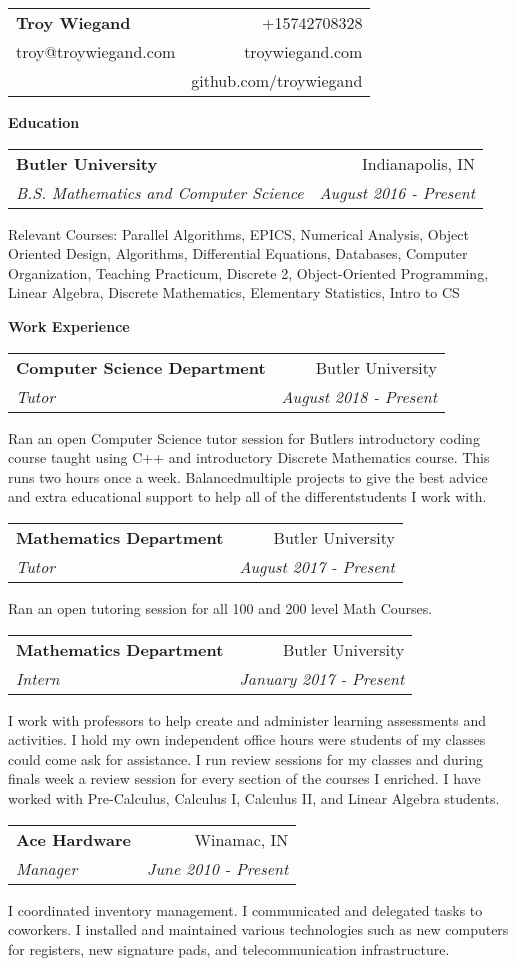 \documentclass[letterpaper,11pt]{article}
\makeatletter
\newcommand{\resheading}[1]{ \begin{trixiematel}\textbf{#1}\end{trixiematel}}
\newcommand{\ressubheading}[4]{
\begin{tabular*}{6.5in}{l@{\extracolsep{\fill}}r}
                \textbf{#1} & #2 \\
                \textit{#3} & \textit{#4} \\
\end{tabular*}\vspace{2pt}}
\newcommand{\Heading}[5]{
    \begin{tabular*}{7in}{l@{\extracolsep{\fill}}r}
        \textbf{\Large #1}  & #2\\
        #3 & #4 \\
        & #5 \\
        \end{tabular*}}
\makeatother
\begin{document}
\Heading{Troy Wiegand}{+15742708328}{troy@troywiegand.com}{troywiegand.com}{github.com/troywiegand}
\vspace{0.1in}

\resheading{Education}
\begin{description}
\item
\ressubheading{Butler University}{Indianapolis, IN}{B.S. Mathematics and Computer Science}{August 2016 - Present} 


Relevant Courses: Parallel Algorithms, EPICS, Numerical Analysis, Object Oriented Design, Algorithms, Differential Equations, Databases, Computer Organization, Teaching Practicum, Discrete 2, Object-Oriented Programming, Linear Algebra, Discrete Mathematics, Elementary Statistics, Intro to CS

\end{description}

\resheading{Work Experience}
\begin{description}
\item
\ressubheading{Computer Science Department}{Butler University}{Tutor}{August 2018 - Present} 


Ran an open Computer Science tutor session for Butlers introductory coding course taught using C++ and introductory Discrete Mathematics course.  This runs two hours once a week.  Balancedmultiple projects to give the best advice and extra educational support to help all of the differentstudents I work with.

\item
\ressubheading{Mathematics Department}{Butler University}{Tutor}{August 2017 - Present} 


Ran an open tutoring session for all 100 and 200 level Math Courses.

\item
\ressubheading{Mathematics Department}{Butler University}{Intern}{January 2017 - Present} 


I work with professors to help create and administer learning assessments and activities. I hold my own independent office hours were students of my classes could come ask for assistance. I run review sessions for my classes and during finals week a review session for every section of the courses I enriched. I have worked with Pre-Calculus, Calculus I, Calculus II, and Linear Algebra students.

\item
\ressubheading{Ace Hardware}{Winamac, IN}{Manager}{June 2010 - Present} 


I coordinated inventory management. I communicated and delegated tasks to coworkers. I installed and maintained various technologies such as new computers for registers, new signature pads, and telecommunication infrastructure.


 \end{description}
\end{document}
